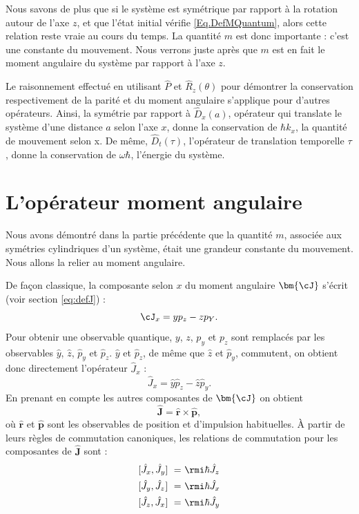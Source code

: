 Nous savons de plus que si le système est symétrique par rapport à la rotation autour de l'axe $z$, et que l'état initial vérifie \ref{Eq.DefMQuantum}, alors cette relation reste vraie au cours du temps. La quantité $m$ est donc importante : c'est une constante du mouvement. Nous verrons juste après que $m$ est en fait le moment angulaire du système par rapport à l'axe $z$.

Le raisonnement effectué en utilisant $\hat{P}$ et $\hat{R}_z(\theta)$ pour démontrer la conservation respectivement de la parité et du moment angulaire s'applique pour d'autres opérateurs. Ainsi, la symétrie par rapport à $\hat{D}_x(a)$, opérateur qui translate le système d'une distance $a$ selon l'axe $x$, donne la conservation de $\hbar k_x$, la quantité de mouvement selon x. De même, $\hat{D}_t(\tau)$, l'opérateur de translation temporelle $\tau$, donne la conservation de $\omega \hbar$, l'énergie du système.

\section{L'opérateur moment angulaire}
Nous avons démontré dans la partie précédente que la quantité $m$, associée aux symétries cylindriques d'un système, était une grandeur constante du mouvement. Nous allons la relier au moment angulaire.

De façon classique, la composante selon $x$ du moment angulaire $\bm{\cJ}$ s'écrit (voir section \ref{eq:defJ}) :
\begin{equation}
\cJ_x=yp_z-zp_Y.
\end{equation}
Pour obtenir une observable quantique, $y$, $z$, $p_y$ et $p_z$ sont remplacés par les observables $\hat{y}$, $\hat{z}$, $\hat{p}_y$ et $\hat{p}_z$. $\hat{y}$ et $\hat{p}_z$, de même que $\hat{z}$ et $\hat{p}_y$, commutent, on obtient donc directement l'opérateur $\hat{J}_x$ :
\begin{equation}
\hat{J}_x=\hat{y}\hat{p}_z-\hat{z}\hat{p}_y.
\end{equation}
En prenant en compte les autres composantes de $\bm{\cJ}$ on obtient 
\begin{equation}
\bm{\hat{J}}=\bm{\hat{r}}\times\bm{\hat{p}},
\end{equation}
où $\bm{\hat{r}}$ et $\bm{\hat{p}}$ sont les observables de position et d'impulsion habituelles. \`A partir de leurs règles de commutation canoniques, les relations de commutation pour les composantes de $\bm{\hat{J}}$ sont :
\begin{equation}
\begin{alignedat}{6}
&[\hat{J}_x,\hat{J}_y&&]~&&=~&&\rmi\hbar &&\hat{J}_z&&\\
&[\hat{J}_y,\hat{J}_z&&]~&&=~&&\rmi\hbar &&\hat{J}_x&&\\
&[\hat{J}_z,\hat{J}_x&&]~&&=~&&\rmi\hbar &&\hat{J}_y&&
\end{alignedat}
\label{Eq.CommutJ}
\end{equation}

